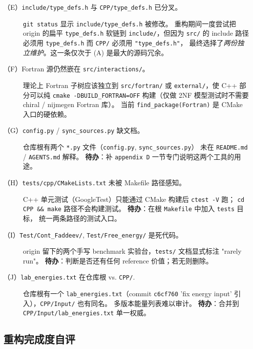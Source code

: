 \begin{description}
\item[（E）\texttt{include/type\_defs.h} 与 \texttt{CPP/type\_defs.h} 已分叉。]
      \texttt{git status} 显示 \texttt{include/type\_defs.h} 被修改。
      重构期间一度尝试把 origin 的扁平 \texttt{type\_defs.h} 软链到
      \texttt{include/}，但因为 \texttt{src/} 的 include 路径必须用
      \texttt{type\_defs.h} 而 \texttt{CPP/} 必须用 \texttt{"type\_defs.h"}，
      最终选择了\emph{两份独立维护}。这一条仅次于 (A) 是最大的源码冗余。

\item[（F）Fortran 源仍然嵌在 \texttt{src/interactions/}。]
      理论上 Fortran 子树应该独立到 \texttt{src/fortran/} 或
      \texttt{external/}，使 C++ 部分可以纯 \texttt{cmake -DBUILD\_FORTRAN=OFF}
      构建（仅做 2NF 模型测试时不需要 chiral / nijmegen Fortran 库）。
      当前 \texttt{find\_package(Fortran)} 是 CMake 入口的硬依赖。

\item[（G）\texttt{config.py} / \texttt{sync\_sources.py} 缺文档。]
      仓库根有两个 \texttt{*.py} 文件（\texttt{config.py}, \texttt{sync\_sources.py}）
      未在 \texttt{README.md} / \texttt{AGENTS.md} 解释。
      \textbf{待办}：补 \texttt{appendix~D} 一节专门说明这两个工具的用途。

\item[（H）\texttt{tests/cpp/CMakeLists.txt} 未被 Makefile 路径感知。]
      C++ 单元测试（GoogleTest）只能通过 CMake 构建后 \texttt{ctest -V} 跑；
      \texttt{cd CPP \&\& make} 路径不会构建测试。
      \textbf{待办}：在根 \texttt{Makefile} 中加入 \texttt{tests} 目标，
      统一两条路径的测试入口。

\item[（I）\texttt{Test/Cont\_Faddeev/}, \texttt{Test/Free\_energy/} 是死代码。]
      origin 留下的两个手写 benchmark 实验台，\texttt{tests/} 文档显式标注
      "rarely run"。
      \textbf{待办}：判断是否还有任何 reference 价值；若无则删除。

\item[（J）\texttt{lab\_energies.txt} 在仓库根 vs. \texttt{CPP/}.]
      仓库根有一个 \texttt{lab\_energies.txt}（commit
      \texttt{c6cf760} 'fix energy input' 引入），\texttt{CPP/Input/} 也有同名。
      多版本能量列表难以审计。
      \textbf{待办}：合并到 \texttt{CPP/Input/lab\_energies.txt} 单一权威。
\end{description}

\subsection{重构完成度自评}

